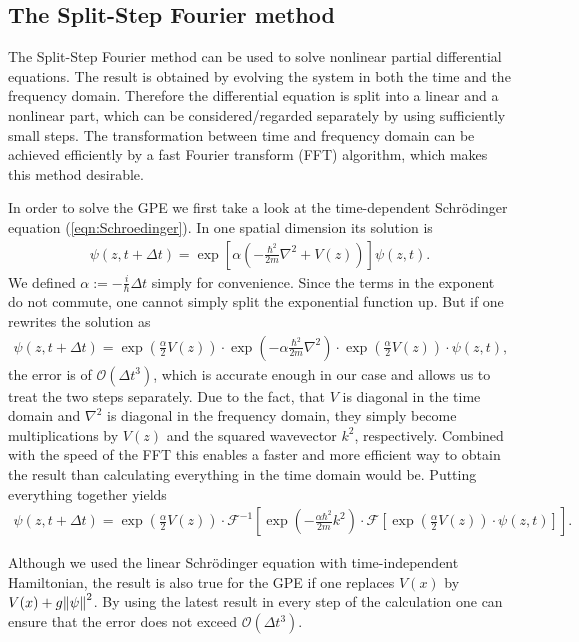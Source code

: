 \subsection{The Split-Step Fourier method}
The Split-Step Fourier method can be used to solve nonlinear partial differential equations. The result is obtained by evolving the system in both the time and the frequency domain. Therefore the differential equation is split into a linear and a nonlinear part, which can be considered/regarded separately by using sufficiently small steps. The transformation between time and frequency domain can be achieved efficiently by a fast Fourier transform (FFT) algorithm, which makes this method desirable.

In order to solve the GPE we first take a look at the time-dependent Schr\"odinger equation (\ref{eqn:Schroedinger}).
In one spatial dimension its solution is
\begin{align}
\psi(z,t+\Delta t) = \exp\left[\alpha \left( -\frac{\hbar^2}{2m}\nabla^2 + V(z)\right) \right]\psi(z,t).
\end{align}
We defined $\displaystyle \alpha := -\frac i \hbar \Delta t $ simply for convenience.
Since the terms in the exponent do not commute, one cannot simply split the exponential function up. But if one rewrites the solution as
\begin{align}
\psi (z,t + \Delta t) = \exp\left(\frac \alpha 2 V(z)\right) \cdot 
\exp\left( -\alpha\frac{\hbar^2}{2m}\nabla^2\right) \cdot
\exp\left(\frac \alpha 2 V(z) \right) \cdot \psi(z,t),
\end{align}
the error is of $\mathcal{O}(\Delta t^3)$, which is accurate enough in our case and allows us to treat the two steps separately. Due to the fact, that $V$ is diagonal in the time domain and $\nabla^2$ is diagonal in the frequency domain, they simply become multiplications by $V(z)$ and the squared wavevector $k^2$, respectively. Combined with the speed of the FFT this enables a faster and more efficient way to obtain the result than calculating everything in the time domain would be.
Putting everything together yields
\begin{align}
\psi (z,t + \Delta t) = \exp\left(\frac \alpha 2 V(z)\right) \cdot \mathcal{F}^{-1} \left[
\exp\left( -\frac{\alpha\hbar^2}{2m}k^2\right) \cdot \mathcal{F} \left[
 \exp\left(\frac \alpha 2 V(z) \right) \cdot \psi(z,t) \right] \right].
\end{align}

Although we used the linear Schr\"odinger equation with time-independent Hamiltonian, the result is also true for the GPE if one replaces $V(x)$ by $V(x) + g\norm{\psi}^2$. By using the latest result in every step of the calculation one can ensure that the error does not exceed $\mathcal{O}(\Delta t^3)$.


